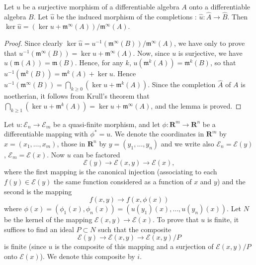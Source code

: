 \begin{lemma}\label{chap5-lem4.2}
Let $u$ be a surjective morphism of a differentiable algebra $A$ onto a differentiable algebra $B$. Let $\widehat{u}$ be the induced morphism of the completions : $\widehat{u} : \widehat{A} \to \widehat{B}$. Then $\ker \widehat{u} = (\ker u + \mathfrak{m}^\infty (A)) / \mathfrak{m}^\infty (A)$.
\end{lemma}

\begin{proof}
Since clearly $\ker \widehat{u} = u^{-1} (\mathfrak{m}^\infty (B)) / \mathfrak{m}^\infty(A)$, we have only to prove that $u^{-1} (\mathfrak{m}^\infty (B)) = \ker u + \mathfrak{m}^\infty (A)$. Now, since $u$ is surjective, we have $u (\mathfrak{m}(A)) = \mathfrak{m}(B)$. Hence, for any $k$, $u (\mathfrak{m}^k (A)) = \mathfrak{m}^k (B)$, so that $u^{-1} (\mathfrak{m}^k (B)) = \mathfrak{m}^k(A) + \ker u$. Hence $u^{-1} (\mathfrak{m}^\infty (B)) = \bigcap\limits_{k \geq 0} (\ker u + \mathfrak{m}^k (A))$. Since the completion $\widehat{A}$ of $A$ is noetherian, it follows from Krull's theorem that $\bigcap\limits_{k \geq 1} (\ker u + \mathfrak{m}^k (A)) = \ker u + \mathfrak{m}^\infty (A)$, and the lemma is proved.
\end{proof}

Let $u : \mathscr{E}_n \to \mathscr{E}_m$ be a quasi-finite morphism, and let $\phi: \mathbf{R}^m \to \mathbf{R}^n$ be a differentiable mapping with $\phi^\ast = u$. We denote the coordinates in $\mathbf{R}^m$ by $x =(x_1, \ldots, x_m)$, those in $\mathbf{R}^n$ by $y = (y_1, \ldots, y_n)$ and we write also $\mathscr{E}_n = \mathscr{E}(y)$, $\mathscr{E}_m = \mathscr{E}(x)$. Now $u$ can be factored
$$
\mathscr{E} (y) \to \mathscr{E} (x,y) \to \mathscr{E} (x),
$$
where the first mapping is the canonical injection (associating to each $f (y) \in \mathscr{E}(y)$ the same function considered as a function of $x$ and $y$) and the second is the mapping
$$
f(x,y) \to f (x,\phi (x))
$$
where $\phi (x) = (\phi_1 (x), \phi_n (x)) = (u(y_1) (x), \ldots, u (y_n)(x))$. Let $N$ be the kernel of the mapping $\mathscr{E} (x,y) \to \mathscr{E}(x)$. To prove that $u$ is finite, it suffices to find an ideal $P\subset N$ such that the composite
$$
\mathscr{E} (y) \to \mathscr{E} (x,y) \to \mathscr{E} (x,y)/ P
$$\pageoriginale
is finite (since $u$ is the composite of this mapping and a surjection of $\mathscr{E}(x,y)/P$ onto $\mathscr{E}(x)$). We denote this composite by $i$.

